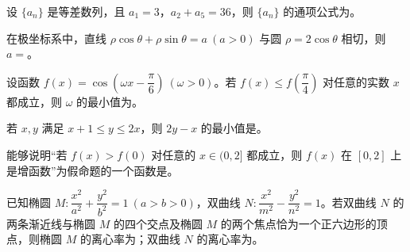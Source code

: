 \begin{question}
设 $\{a_n\}$ 是等差数列，且 $a_1=3$，$a_2+a_5=36$，则 $\{a_n\}$ 的通项公式为\gkblank{}。

\end{question}
\begin{question}
在极坐标系中，直线 $\rho\cos\theta+\rho\sin\theta=a\ (a>0)$ 与圆 $\rho=2\cos\theta$ 相切，则 $a=$\gkblank{}。

\end{question}
\begin{question}
设函数 $f(x)=\cos\left(\omega x-\dfrac\pi6\right)\ (\omega>0)$。若 $f(x)\leqslant f\left(\dfrac\pi4\right)$ 对任意的实数 $x$ 都成立，则 $\omega$ 的最小值为\gkblank{}。

\end{question}
\begin{question}
若 $x,y$ 满足 $x+1\leqslant y\leqslant2x$，则 $2y-x$ 的最小值是\gkblank{}。

\end{question}
\begin{question}
能够说明“若 $f(x)>f(0)$ 对任意的 $x\in(0,2]$ 都成立，则 $f(x)$ 在 $[0,2]$ 上是增函数”为假命题的一个函数是\gkblank{}。

\end{question}
\begin{question}
已知椭圆 $M:\dfrac{x^2}{a^2}+\dfrac{y^2}{b^2}=1\ (a>b>0)$，双曲线 $N:\dfrac{x^2}{m^2}-\dfrac{y^2}{n^2}=1$。若双曲线 $N$ 的两条渐近线与椭圆 $M$ 的四个交点及椭圆 $M$ 的两个焦点恰为一个正六边形的顶点，则椭圆 $M$ 的离心率为\gkblank{}；双曲线 $N$ 的离心率为\gkblank{}。

\end{question}

